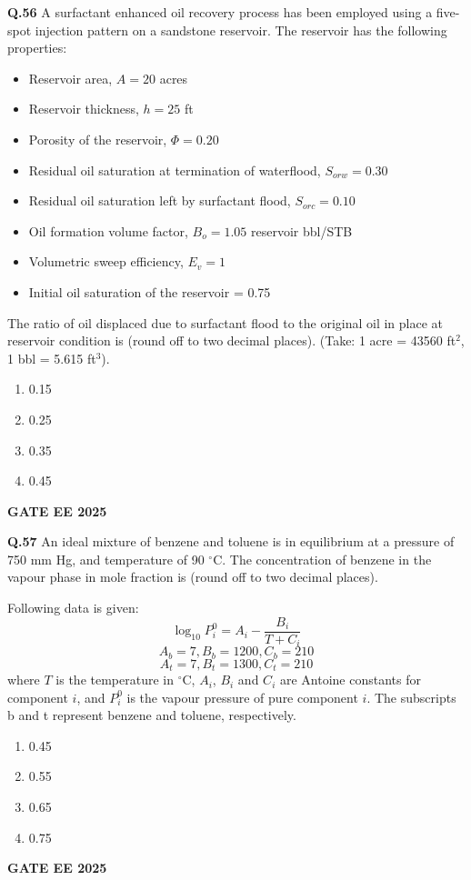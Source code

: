\documentclass{article}
\begin{document}
\vspace{0.5cm}

\textbf{Q.56} A surfactant enhanced oil recovery process has been employed using a five-spot injection pattern on a sandstone reservoir. The reservoir has the following properties:

\begin{itemize}
\item Reservoir area, $A = 20$ acres
\item Reservoir thickness, $h = 25$ ft
\item Porosity of the reservoir, $\Phi = 0.20$
\item Residual oil saturation at termination of waterflood, $S_{orw} = 0.30$
\item Residual oil saturation left by surfactant flood, $S_{orc} = 0.10$
\item Oil formation volume factor, $B_o = 1.05$ reservoir bbl/STB
\item Volumetric sweep efficiency, $E_v = 1$
\item Initial oil saturation of the reservoir = 0.75
\end{itemize}

The ratio of oil displaced due to surfactant flood to the original oil in place at reservoir condition is \underline{\hspace{1cm}} (round off to two decimal places).
(Take: 1 acre = 43560 ft$^2$, 1 bbl = 5.615 ft$^3$).
\begin{enumerate}[label=(\Alph*)]
    \item 0.15
    \item 0.25
    \item 0.35
    \item 0.45
\end{enumerate}
\textbf{GATE EE 2025}

\vspace{0.5cm}

\textbf{Q.57} An ideal mixture of benzene and toluene is in equilibrium at a pressure of 750 mm Hg, and temperature of 90 $^\circ$C. The concentration of benzene in the vapour phase in mole fraction is \underline{\hspace{1cm}} (round off to two decimal places).

Following data is given:
\[
\log_{10} P_i^0 = A_i - \frac{B_i}{T + C_i}
\]
\[
A_b = 7, B_b = 1200, C_b = 210
\]
\[
A_t = 7, B_t = 1300, C_t = 210
\]
where $T$ is the temperature in $^\circ$C, $A_i$, $B_i$ and $C_i$ are Antoine constants for component $i$, and $P_i^0$ is the vapour pressure of pure component $i$. The subscripts b and t represent benzene and toluene, respectively.
\begin{enumerate}[label=(\Alph*)]
    \item 0.45
    \item 0.55
    \item 0.65
    \item 0.75
\end{enumerate}
\textbf{GATE EE 2025}
\end{document}
